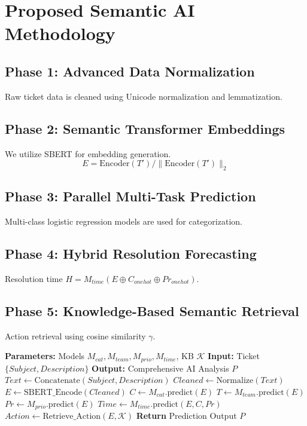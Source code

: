 \documentclass[conference]{IEEEtran}
\begin{document}
\section{Proposed Semantic AI Methodology}

\subsection{Phase 1: Advanced Data Normalization}
Raw ticket data is cleaned using Unicode normalization and lemmatization.

\subsection{Phase 2: Semantic Transformer Embeddings}
We utilize SBERT \cite{sbert2019} for embedding generation.
\begin{equation}
E = \text{Encoder}(T') / \lVert \text{Encoder}(T') \rVert_2
\end{equation}

\subsection{Phase 3: Parallel Multi-Task Prediction}
Multi-class logistic regression models are used for categorization.

\subsection{Phase 4: Hybrid Resolution Forecasting}
Resolution time $H = M_{time}(E \oplus C_{onehot} \oplus Pr_{onehot})$.

\subsection{Phase 5: Knowledge-Based Semantic Retrieval}
Action retrieval using cosine similarity $\gamma$.

\begin{algorithm}
\caption{Proposed Prediction Orchestration}
\begin{algorithmic}[1]
\STATE \textbf{Parameters:} Models $M_{cat}, M_{team}, M_{prio}, M_{time}$, KB $\mathcal{K}$
\STATE \textbf{Input:} Ticket $\{Subject, Description\}$
\STATE \textbf{Output:} Comprehensive AI Analysis $P$
\STATE $Text \gets \text{Concatenate}(Subject, Description)$
\STATE $Cleaned \gets \text{Normalize}(Text)$
\STATE $E \gets \text{SBERT\_Encode}(Cleaned)$
\STATE $C \gets M_{cat}.\text{predict}(E)$
\STATE $T \gets M_{team}.\text{predict}(E)$
\STATE $Pr \gets M_{prio}.\text{predict}(E)$
\STATE $Time \gets M_{time}.\text{predict}(E, C, Pr)$
\STATE $Action \gets \text{Retrieve\_Action}(E, \mathcal{K})$
\STATE \textbf{Return} Prediction Output $P$
\end{algorithmic}
\end{algorithm}
\end{document}
